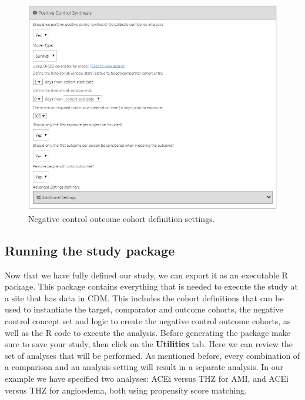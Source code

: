 \documentclass[11pt]{book}
\theoremstyle{definition}
\theoremstyle{definition}
\theoremstyle{definition}
\theoremstyle{remark}
\begin{document}
\begin{figure}

{\centering \includegraphics[width=1\linewidth]{images/PopulationLevelEstimation/pcSynthesis} 

}

\caption{Negative control outcome cohort definition settings.}\label{fig:pcSynthesis}
\end{figure}

\hypertarget{running-the-study-package}{%
\subsection{Running the study package}\label{running-the-study-package}}

Now that we have fully defined our study, we can export it as an executable R package. This package contains everything that is needed to execute the study at a site that has data in CDM. This includes the cohort definitions that can be used to instantiate the target, comparator and outcome cohorts, the negative control concept set and logic to create the negative control outcome cohorts, as well as the R code to execute the analysis. Before generating the package make sure to save your study, then click on the \textbf{Utilities} tab. Here we can review the set of analyses that will be performed. As mentioned before, every combination of a comparison and an analysis setting will result in a separate analysis. In our example we have specified two analyses: ACEi versus THZ for AMI, and ACEi versus THZ for angioedema, both using propensity score matching.
\end{document}

